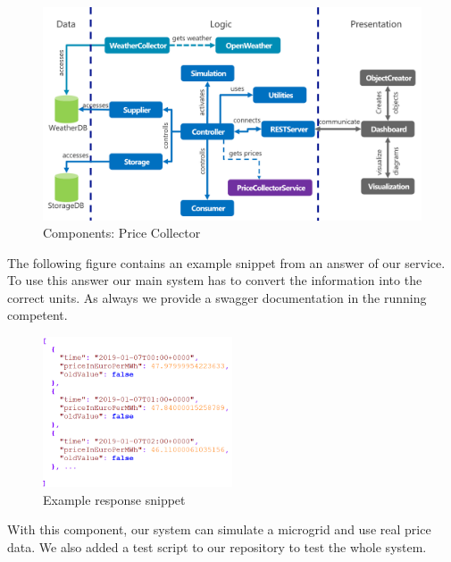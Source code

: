 \begin{figure}[htpb]
	\centering
	\includegraphics[width=1.00\textwidth]{../figures/Architecture2.pdf}
	\caption{Components: Price Collector}
	\label{fig:updatedA}
\end{figure}

\noindent The following figure contains an example snippet from an answer of our service. To use this answer our main system has to convert the information into the correct units. As always we provide a swagger documentation in the running competent.  

\begin{figure}[htpb]
	\centering
	\includegraphics[width=0.5\textwidth]{../figures/response.png}
	\caption{Example response snippet}
	\label{fig:snipped}
\end{figure}
 
\noindent With this component, our system can simulate a microgrid and use real price data. We also added a test script to our repository to test the whole system. 
 \FloatBarrier